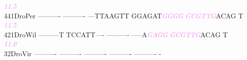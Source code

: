 \documentclass[11pt,twoside,reqno,a4paper]{article}
\begin{document}
{\hspace*{4\charwidth}\hspace*{7\charwidth}\hspace*{1\charwidth}\hspace*{1\charwidth}\hspace*{1\charwidth}\hspace*{36\charwidth}\textit{\textcolor{violet}{11.5}}\hspace*{1\charwidth}\hspace*{1\charwidth}\\
441\hspace*{1\charwidth}DroPer	----------	----------	---TTAAGTT	GGAGAT\textit{\textcolor{violet}{G}}\textit{\textcolor{violet}{G}}\textit{\textcolor{violet}{G}}\textit{\textcolor{violet}{G}}	\textit{\textcolor{violet}{G}}\textit{\textcolor{violet}{C}}\textit{\textcolor{violet}{G}}\textit{\textcolor{violet}{T}}\textit{\textcolor{violet}{T}}\textit{\textcolor{violet}{G}}ACAG	T\\
\hspace*{4\charwidth}\hspace*{7\charwidth}\hspace*{1\charwidth}\hspace*{1\charwidth}\hspace*{1\charwidth}\hspace*{36\charwidth}\textit{\textcolor{violet}{11.5}}\hspace*{1\charwidth}\hspace*{1\charwidth}\\
421\hspace*{1\charwidth}DroWil	---------T	TCCATT----	----------	-----A\textit{\textcolor{violet}{G}}\textit{\textcolor{violet}{A}}\textit{\textcolor{violet}{G}}\textit{\textcolor{violet}{G}}	\textit{\textcolor{violet}{G}}\textit{\textcolor{violet}{C}}\textit{\textcolor{violet}{G}}\textit{\textcolor{violet}{T}}\textit{\textcolor{violet}{T}}\textit{\textcolor{violet}{G}}ACAG	T\\
\hspace*{4\charwidth}\hspace*{7\charwidth}\hspace*{1\charwidth}\hspace*{1\charwidth}\hspace*{1\charwidth}\hspace*{36\charwidth}\textit{\textcolor{violet}{11.0}}\hspace*{1\charwidth}\hspace*{1\charwidth}\\
32\hspace*{2\charwidth}DroVir	----------	----------	----------	----------	----------	-\\
\hspace*{4\charwidth}\hspace*{7\charwidth}\hspace*{1\charwidth}\hspace*{1\charwidth}\hspace*{1\charwidth}\hspace*{1\charwidth}\hspace*{1\charwidth}\\
\\
}
\end{document}
